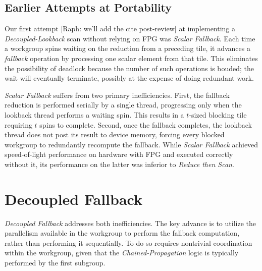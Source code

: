 \documentclass[sigconf]{acmart}
\newcommand{\raph}[1]{{\footnotesize\color{magenta}[Raph: #1]}}
\begin{document}
\subsection{Earlier Attempts at Portability}
Our first attempt \raph{we'll add the cite post-review} at implementing a \emph{Decoupled-Lookback} scan without relying on FPG was \emph{Scalar Fallback}. Each time a workgroup spins waiting on the reduction from a preceding tile, it advances a \emph{fallback} operation by processing one scalar element from that tile. This eliminates the possibility of deadlock because the number of such operations is bouded; the wait will eventually terminate, possibly at the expense of doing redundant work.

\emph{Scalar Fallback} suffers from two primary inefficiencies. First, the fallback reduction is performed serially by a single thread, progressing only when the lookback thread performs a waiting spin. This results in a $t$-sized blocking tile requiring $t$ spins to complete. Second, once the fallback completes, the lookback thread does not post its result to device memory, forcing every blocked workgroup to redundantly recompute the fallback. While \emph{Scalar Fallback} achieved speed-of-light performance on hardware with FPG and executed correctly without it, its performance on the latter was inferior to \emph{Reduce then Scan}.

\section{Decoupled Fallback}
\emph{Decoupled Fallback} addresses both inefficiencies. The key advance is to utilize the parallelism available in the workgroup to perform the fallback computation, rather than performing it sequentially. To do so requires nontrivial coordination within the workgroup, given that the \emph{Chained-Propagation} logic is typically performed by the first subgroup.
\end{document}

